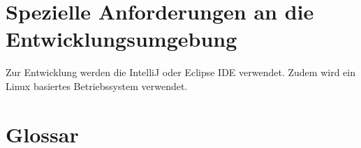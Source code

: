 \documentclass[parskip=full,11pt,twoside]{scrartcl}
\begin{document}
\section{Spezielle Anforderungen an die Entwicklungsumgebung}
Zur Entwicklung werden die IntelliJ oder Eclipse IDE verwendet.
Zudem wird ein \gls{Linux} basiertes Betriebssystem verwendet.

\section{Glossar}
\printglossaries
\end{document}
